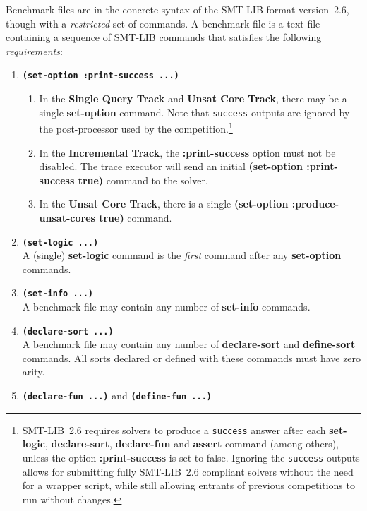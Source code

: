 \documentclass[12pt]{article}
\newcommand{\akey}[1]{\textbf{#1}}
\newcommand{\bkey}[1]{\textbf{\texttt{#1}}}
\newcommand{\maintrack}{Single Query Track\xspace}
\newcommand{\inctrack}{Incremental Track\xspace}
\newcommand{\ucoretrack}{Unsat Core Track\xspace}
\begin{document}
Benchmark files are in the concrete syntax of the SMT-LIB format
version~2.6, though with a \emph{restricted} set of commands.  A benchmark
file is a text file containing a sequence of SMT-LIB commands that
satisfies the following \emph{requirements}:
%
\begin{enumerate}
  \item
    \bkey{(set-option :print-success ...)}
    \begin{enumerate}
      \vspace{-1ex}
      \item In the \textbf{\maintrack} and \textbf{\ucoretrack}, there may be a
        single \akey{set-option} command.  Note that \texttt{success} outputs
        are ignored by the post-processor used by the
        competition.\footnote{SMT-LIB~2.6 requires solvers to produce a
        \texttt{success} answer after each \akey{set-logic},
        \akey{declare-sort}, \akey{declare-fun} and \akey{assert} command
        (among others), unless the option \akey{:print-success} is set to
        false.  Ignoring the \texttt{success} outputs allows for submitting
        fully SMT-LIB~2.6 compliant solvers without the need for a wrapper
        script, while still allowing entrants of previous competitions to run
        without changes.}
      \item In the \textbf{\inctrack}, the \akey{:print-success} option
      must not be disabled.  The trace executor will send an initial
        \akey{(set-option :print-success true)} command to the solver.
      \item In the \textbf{\ucoretrack}, there is a single \akey{(set-option
        :produce-unsat-cores true)} command.
    \end{enumerate}
  \item \bkey{(set-logic ...)}\\
    A (single) \akey{set-logic} command is the \emph{first} command after
    any \akey{set-option} commands.
  \item \bkey{(set-info ...)}\\
    A benchmark file may contain any number of \akey{set-info} commands.
  \item \bkey{(declare-sort ...)}\\
    A benchmark file may contain any number of \akey{declare-sort} and
    \akey{define-sort} commands.  All sorts declared or defined with these
    commands must have zero arity.
  \item \bkey{(declare-fun ...)} and \bkey{(define-fun ...)}\\

\end{enumerate}
\end{document}
